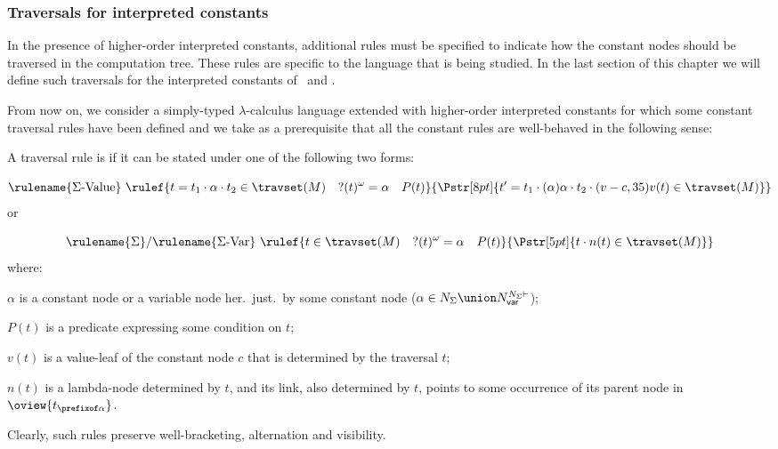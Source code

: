 \subsubsection{Traversals for interpreted constants}

In the presence of higher-order interpreted constants, additional rules must be specified to indicate how
the constant nodes should be traversed in the computation tree. These rules are specific to the language that is being studied.
In the last section of this chapter we will define such traversals for the interpreted constants of
\pcf\ and \ialgol.

From now on, we consider a simply-typed $\lambda$-calculus language extended with higher-order interpreted constants for which some constant traversal rules have been defined and
we take as a  prerequisite that all the constant rules are well-behaved in the following sense:
\begin{definition}
\label{def:wellbehaved_traversal} A traversal rule is
 if it can be stated under one of the following two forms:
    $$\rulename{\Sigma\mbox{-Value}}\ \rulef{t = t_1\cdot \alpha \cdot t_2 \in \travset(M) \quad ?(t)^\omega = \alpha \quad P(t)}
      {
        \stackrel{\rule{0pt}{3pt} }{
            \Pstr[8pt]{ t' = t_1\cdot (\alpha){\alpha} \cdot t_2 \cdot (v-c,35){v(t)} \in {\travset(M)}}
            }
       }
       $$
or
$$\rulename{\Sigma}/\rulename{\Sigma\mbox{-Var}}\ \rulef{t \in \travset(M) \quad ?(t)^\omega = \alpha \quad P(t)}
  { \stackrel{  \rule{0pt}{3pt} }{\Pstr[5pt]{ t \cdot {n(t)} \in {\travset(M)}}}
   }$$
    where:
    \begin{compactitem}
      \item $\alpha$ is a constant node or a variable node her.\ just.\ by some constant node ($\alpha \in N_\Sigma \union N^{N_\Sigma\vdash}_{\sf var}$);
      \item $P(t)$ is a predicate expressing some condition on $t$;
      \item $v(t)$ is a value-leaf of the constant node $c$ that is determined by the traversal $t$;
      \item $n(t)$ is a lambda-node determined by $t$, and its link, also determined by $t$, points to some occurrence of its parent node in $\oview{t_{\prefixof \alpha}}$.
    \end{compactitem}
Clearly, such rules preserve well-bracketing, alternation and visibility.
\end{definition}

